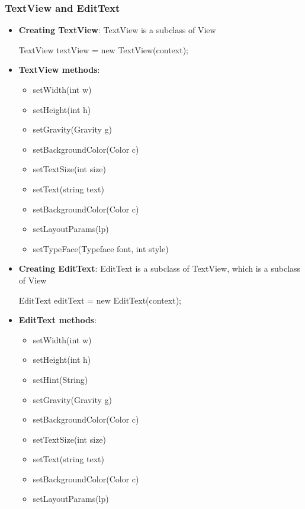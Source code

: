 \documentclass{report}
\begin{document}
    \subsubsection{TextView and EditText}
    \begin{itemize}
        \item \textbf{Creating TextView}: TextView is a subclass of View
            \bigbreak \noindent 
            \begin{javacode}
            TextView textView = new TextView(context);
            \end{javacode}
        \item \textbf{TextView methods}:
            \begin{itemize}
                \item setWidth(int w)
                \item setHeight(int h)
                \item setGravity(Gravity g)
                \item setBackgroundColor(Color c)
                \item setTextSize(int size)
                \item setText(string text)
                \item setBackgroundColor(Color c)
                \item setLayoutParams(lp)
                \item setTypeFace(Typeface font, int style)
            \end{itemize}
        \item \textbf{Creating EditText}: EditText is a subclass of TextView, which is a subclass of View
            \bigbreak \noindent 
            \begin{javacode}
            EditText editText = new EditText(context);
            \end{javacode}
        \item \textbf{EditText methods}:
            \begin{itemize}
                \item setWidth(int w)
                \item setHeight(int h)
                \item setHint(String)
                \item setGravity(Gravity g)
                \item setBackgroundColor(Color c)
                \item setTextSize(int size)
                \item setText(string text)
                \item setBackgroundColor(Color c)
                \item setLayoutParams(lp)
            \end{itemize}
    \end{itemize}
\end{document}
